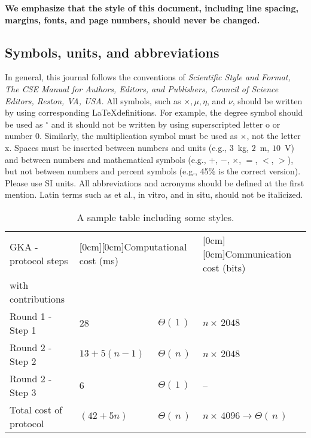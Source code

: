 \documentclass{elektr}
\begin{document}
\textbf{We emphasize that the style of this document, including line spacing, margins, fonts, and page numbers, should never be changed.}  

\subsection{Symbols, units, and abbreviations}

In general, this journal follows the conventions of \textit{Scientific Style and Format, The CSE Manual for Authors, Editors, and Publishers, Council of Science Editors, Reston, VA, USA}. All symbols, such as $\times, \mu, \eta$, and $\nu$, should be written by using corresponding \LaTeX definitions. For example, the degree symbol should be used as $^{\circ}$ and it should not be written by using superscripted letter o or number 0. Similarly, the multiplication symbol must be used as $\times$, not the letter x. Spaces must be inserted between numbers and units (e.g., $3$~kg, $2$~m, $10$~V) and between numbers and mathematical symbols (e.g., $+$, $-$, $\times$, $=$, $<$, $>$), but not between numbers and percent symbols (e.g., 45{\%} is the correct version). Please use SI units. All abbreviations and acronyms should be defined at the first mention. Latin terms such as et al., in vitro, and in situ, should not be italicized. 

\begin{table}[h!]
\caption{A sample table including some styles.}
\begin{center}
\begin{tabular}{|l|l|l|l|}
\hline
GKA - protocol steps & 
\multicolumn{2}{|l|}{\raisebox{-1.50ex}[0cm][0cm]{Computational cost (ms)}}& 
\raisebox{-1.50ex}[0cm][0cm]{Communication cost (bits)} \\
with contributions& 
\multicolumn{2}{|l|}{} & 
 \\
\hline
Round 1 - Step 1& 
28& 
${\Theta }(\, 1\, )$& 
$n\times \, 2048$ \\
\hline
Round 2 - Step 2& 
$13+5(n-1)$& 
${\Theta }(\, n\, )$& 
$n\times \, 2048$ \\
\hline
Round 2 - Step 3& 
6& 
${\Theta }(\, 1\, )$& 
-- \\
\hline
Total cost of protocol& 
$(42+5n)$& 
${\Theta }(\, n\, )$& 
${n\times \, }4096  \to  {\Theta }(\, n\, )$ \\
\hline
\end{tabular}
\label{tab1}
\end{center}\vs{-4mm}
\end{table}
\end{document}
